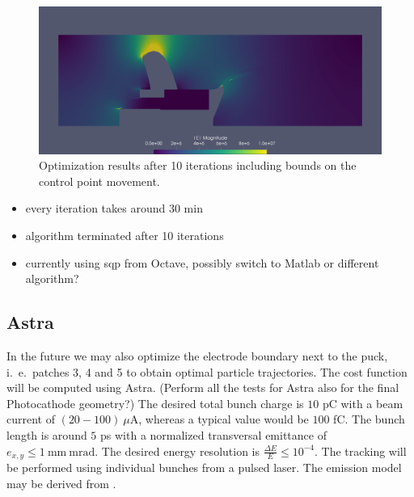 \begin{center}
\begin{figure}[H]
  \includegraphics[width=\textwidth]{figures/200kV/gradient_optim_run1}
  \caption{Optimization results after 10 iterations including bounds on the control point movement.}
\end{figure}
\end{center}

\begin{itemize}
   \item every iteration takes around 30 min
   \item algorithm terminated after 10 iterations
   \item currently using sqp from Octave, possibly switch to Matlab or different algorithm?
\end{itemize}

\subsection{Astra}
In the future we may also optimize the electrode boundary next to the puck, i.~e.~patches 3, 4 and 5 to obtain optimal particle trajectories. The cost function will be computed using Astra. (Perform all the tests for Astra also for the final Photocathode geometry?)
The desired total bunch charge is $10$ pC with a beam current of $(20-100)\ \mu\mathrm{A}$, whereas a typical value would be $100$ fC. The bunch length is around $5$ ps with a normalized transversal emittance of $e_{x,y} \leq 1\ \mathrm{mm\ mrad}$. The desired energy resolution is $\frac{\Delta E}{E} \leq 10^{-4}$.
The tracking will be performed using individual bunches from a pulsed laser. The emission model may be derived from \cite{wagner}.
